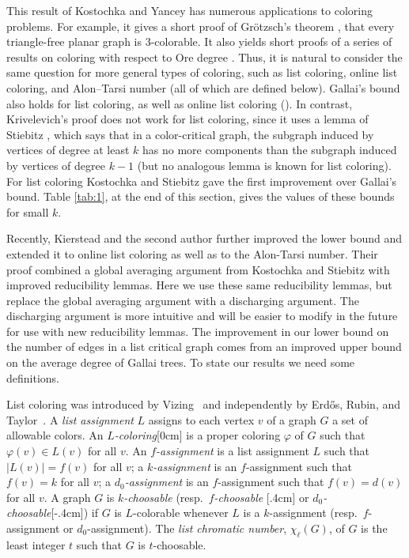 \documentclass[12pt]{article}
\theoremstyle{plain}
\theoremstyle{definition}
\theoremstyle{remark}
\def\chil{{\chi_\ell}}
\newcommand{\aside}[1]{\marginnote{\scriptsize{#1}}[0cm]}
\newcommand{\aaside}[2]{\marginnote{\scriptsize{#1}}[#2]}
\begin{document}
This result of Kostochka and Yancey has numerous applications to coloring problems.
For example, it gives a short proof of Gr\"otzsch's theorem
\cite{kostochka2012oregrotsch}, that every
triangle-free planar graph is 3-colorable.  It also 
 yields short proofs of a series of results on coloring with
respect to Ore degree \cite{kierstead2009ore, rabern2010a, krs_one}. 
%
Thus,
it is natural to consider the same question for more general types of coloring,
such as list coloring, online list coloring, and Alon--Tarsi number (all of
which are defined below).
Gallai's bound
\cite{gallai1963kritische} also holds for list coloring, as well as online list coloring
(\cite{kostochkastiebitzedgesincriticalgraph, riasat2012critically}). 
In contrast,
Krivelevich's proof \cite{krivelevich1997minimal} does not work for list
coloring, since it uses a lemma of Stiebitz \cite{stiebitz1982proof}, which says that
in a color-critical graph, the subgraph induced by vertices of degree at least
$k$ has no more components than the subgraph induced by vertices of degree
$k-1$ (but no analogous lemma is known for list coloring). For list coloring Kostochka and Stiebitz
\cite{kostochkastiebitzedgesincriticalgraph} gave the first improvement over
Gallai's bound. 
Table \ref{tab:1}, at the end of this section, gives the values of these bounds
for small $k$. 

Recently, Kierstead and the
second author \cite{OreVizing} further improved the lower bound and extended it
to online list coloring as well as to the Alon-Tarsi number.  Their proof combined
a global averaging argument from Kostochka and Stiebitz
\cite{kostochkastiebitzedgesincriticalgraph} with improved reducibility lemmas.
 Here we use these same reducibility lemmas, but replace the global averaging
argument with a discharging argument.  The discharging argument is more
intuitive and will be easier to modify in the future for use with new
reducibility lemmas.  The improvement in our lower bound on the number of edges
in a list critical graph comes from an improved upper bound on the average
degree of Gallai trees.  To state our results we need some definitions.


List coloring was introduced by Vizing~\cite{vizing1976} and independently by
Erd\H{o}s,
Rubin, and Taylor~\cite{erdos1979choosability}.
A \emph{list assignment} $L$ assigns to each vertex $v$ of a graph $G$ a set of
allowable colors.  An \emph{$L$-coloring}\aside{$L$-coloring} is a proper
coloring $\varphi$ of $G$ such that $\varphi(v)\in L(v)$ for all $v$.  An
\emph{$f$-assignment} is a list assignment $L$ such that $|L(v)|=f(v)$ for all
$v$; a \emph{$k$-assignment} is an $f$-assignment such that $f(v)=k$ for all
$v$; a \emph{$d_0$-assignment} is an $f$-assignment such that $f(v)=d(v)$ for
all $v$.
A graph $G$ is \emph{$k$-choosable} (resp.~\emph{$f$-choosable}
\aaside{$f$-choosable}{.4cm} or
\emph{$d_0$-choosable}\aaside{$d_0$-choosable}{-.4cm}) if $G$
is $L$-colorable whenever $L$ is a $k$-assignment (resp.~$f$-assignment or
$d_0$-assignment).  The \emph{list chromatic number}, $\chil(G)$, of $G$ is the
least integer $t$ such that $G$ is $t$-choosable.  
\end{document}
